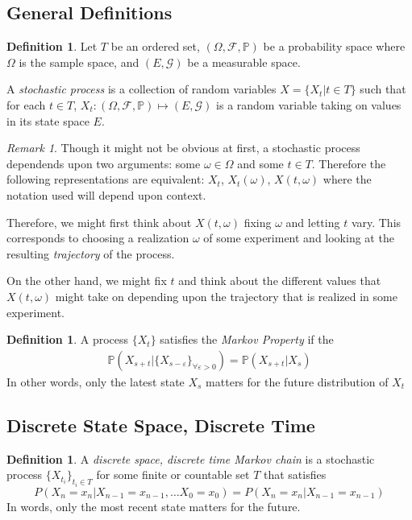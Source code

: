 \documentclass[12pt]{article}
\theoremstyle{plain}
\theoremstyle{definition}
\newtheorem{defn}[thm]{Definition}
\theoremstyle{remark}
\newtheorem*{rmk}{Remark}
\begin{document}
\subsection{General Definitions}

\begin{defn}{\citep{pavliotis}}
Let $T$ be an ordered set, $(\Omega,\mathscr{F},\mathbb{P})$ be a
probability space where $\Omega$ is the sample space, and
$(E,\mathscr{G})$ be a measurable space.

A \emph{stochastic process} is a collection of random variables $X =
\{X_t | t\in T\}$ such that for each $t\in T$, $X_t:
(\Omega,\mathscr{F},\mathbb{P})\mapsto (E,\mathscr{G})$ is a random
variable taking on values in its state space $E$.
\end{defn}

\begin{rmk}
Though it might not be obvious at first, a stochastic process dependends
upon two arguments: some $\omega\in\Omega$ and some $t\in T$. Therefore
the following representations are equivalent: $X_t$, $X_t(\omega)$,
$X(t,\omega)$ where the notation used will depend upon context.

Therefore, we might first think about $X(t,\omega)$ fixing $\omega$ and
letting $t$ vary. This corresponds to choosing a realization $\omega$ of
some experiment and looking at the resulting \emph{trajectory} of the
process.

On the other hand, we might fix $t$ and think about the different values
that $X(t,\omega)$ might take on depending upon the trajectory that is
realized in some experiment.
\end{rmk}

\begin{defn}
A process $\{X_t\}$ satisfies the \emph{Markov Property} if the
\begin{align*}
\mathbb{P}\left(X_{s+t} | \{X_{s-\varepsilon}\}_{\forall\varepsilon>0}\right)
= \mathbb{P}\left(X_{s+t} | X_{s}\right)
\end{align*}
In other words, only the latest state $X_s$ matters for the future distribution of $X_t$

\end{defn}

\subsection{Discrete State Space, Discrete Time}

\begin{defn}
A \emph{discrete space, discrete time Markov chain} is a stochastic
process $\{X_{t_i}\}_{t_i\in T}$ for some finite or countable set $T$
that satisfies
\begin{equation}
  P(X_n = x_n | X_{n-1} = x_{n-1}, \ldots
  X_0 = x_0) = P(X_n = x_n | X_{n-1}=x_{n-1})
\end{equation}
In words, only the most recent state matters for the future.
\end{defn}
\end{document}
